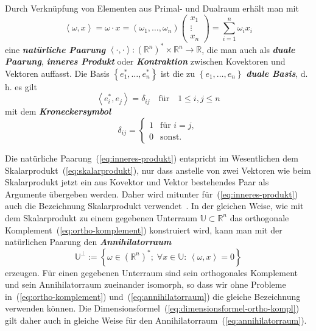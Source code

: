 Durch Verknüpfung von Elementen aus Primal- und Dualraum erhält man
mit
\begin{equation}
\left\langle \omega,x\right\rangle =\omega\cdot x=\left(\omega_{1},\ldots,\omega_{n}\right)\left(\begin{array}{c}
x_{1}\\
\vdots\\
x_{n}
\end{array}\right)=\sum_{i=1}^{n}\omega_{i}x_{i}\label{eq:inneres-produkt}
\end{equation}
eine \textbf{\em natürliche Paarung}  $\left\langle \cdot,\cdot\right\rangle :({\mathbb{R}}^{n})^{*}\times{\mathbb{R}}^{n}\to{\mathbb{R}}$,
die man auch als \textbf{\em duale Paarung}, \textbf{\em inneres Produkt}
oder \textbf{\em Kontraktion} zwischen Kovektoren und Vektoren auffasst.
Die Basis $\left\{ e_{1}^{*},\ldots,e_{n}^{*}\right\} $ ist die zu
$\left\{ e_{1},\ldots,e_{n}\right\} $ \textbf{\em duale Basis}, d.\,h.
es gilt
\[
\left\langle e_{i}^{*},e_{j}\right\rangle =\delta_{ij}\quad\textrm{für}\quad1\leq i,j\leq n
\]
mit dem \textbf{\em Kroneckersymbol}
\[
\delta_{ij}=\left\{ \begin{array}{cl}
1 & \textrm{für }i=j,\\
0 & \textrm{sonst.}
\end{array}\right.
\]

Die natürliche Paarung~(\ref{eq:inneres-produkt}) entspricht im
Wesentlichen dem Skalarprodukt~(\ref{eq:skalarprodukt}), nur dass
anstelle von zwei Vektoren wie beim Skalarprodukt jetzt ein aus Kovektor
und Vektor bestehendes Paar als Argumente übergeben werden. Daher
wird mitunter für~(\ref{eq:inneres-produkt}) auch die Bezeichnung
Skalarprodukt verwendet~\cite{bishop1980}. In der gleichen Weise,
wie mit dem Skalarprodukt zu einem gegebenen Unterraum $\mathbb{U}\subset{\mathbb{R}}^{n}$
das orthogonale Komplement~(\ref{eq:ortho-komplement}) konstruiert
wird, kann man mit der natürlichen Paarung den \textbf{\em Annihilatorraum}
\begin{equation}
\mathbb{U}^{\perp}:=\left\{ \omega\in({\mathbb{R}}^{n})^{*};\;\forall x\in\mathbb{U}:\,\left\langle \omega,x\right\rangle =0\right\} \label{eq:annihilatorraum}
\end{equation}
erzeugen. Für einen gegebenen Unterraum sind sein orthogonales Komplement
und sein Annihilatorraum zueinander isomorph, so dass wir ohne Probleme
in~(\ref{eq:ortho-komplement}) und~(\ref{eq:annihilatorraum})
die gleiche Bezeichnung verwenden können. Die Dimensionsformel~(\ref{eq:dimensionsformel-ortho-kompl})
gilt daher auch in gleiche Weise für den Annihilatorraum~(\ref{eq:annihilatorraum}).


